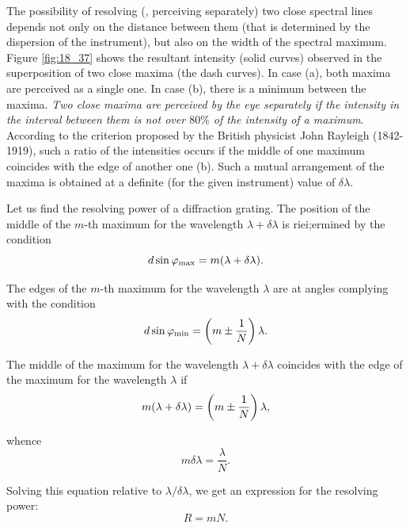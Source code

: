 The possibility of resolving (\ie, perceiving separately) two close spectral lines depends not only on the distance between them (that is determined by the dispersion of the instrument), but also on the width of the spectral maximum.
Figure \ref{fig:18_37} shows the resultant intensity (solid curves) observed in the superposition of two close maxima (the dash curves).
In case (a), both maxima are perceived as a single one.
In case (b), there is a minimum between the maxima.
\textit{Two close maxima are perceived by the eye separately if the intensity in the interval between them is not over $80\%$ of the intensity
of a maximum}.
According to the criterion proposed by the British physicist John Rayleigh (1842-1919), such a ratio of the intensities occurs if the middle of one maximum coincides with the edge of another one (b).
Such a mutual arrangement of the maxima is obtained at a definite (for the given instrument) value of $\delta{\lambda}$.

Let us find the resolving power of a diffraction grating.
The position of the middle of the $m$-th maximum for the wavelength $\lambda+\delta{\lambda}$ is riei;ermined by the condition
\begin{equation*}
	d \sin\varphi_{\text{max}} = m (\lambda + \delta{\lambda}).
\end{equation*}

\noindent
The edges of the $m$-th maximum for the wavelength $\lambda$ are at angles complying with the condition
\begin{equation*}
	d \sin\varphi_{\text{min}} = \left(m \pm \frac{1}{N}\right) \lambda.
\end{equation*}

\noindent
The middle of the maximum for the wavelength $\lambda + \delta{\lambda}$ coincides with the edge of the maximum for the wavelength $\lambda$ if
\begin{equation*}
	m (\lambda + \delta{\lambda}) = \left(m \pm \frac{1}{N}\right) \lambda,
\end{equation*}

\noindent
whence
\begin{equation*}
	m \delta{\lambda} = \frac{\lambda}{N}.
\end{equation*}

\noindent
Solving this equation relative to $\lambda/\delta{\lambda}$, we get an expression for the
resolving power:
\vspace{-12pt}
\begin{equation}\label{eq:18_55}
	R = mN.
\end{equation}

